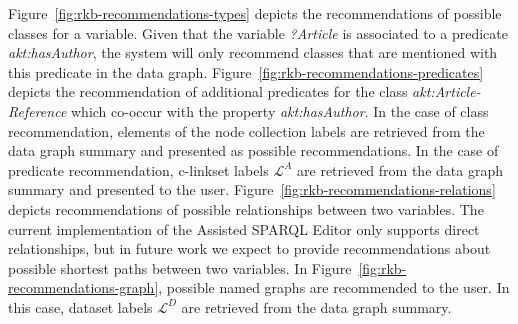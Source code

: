 Figure~\ref{fig:rkb-recommendations-types} depicts the recommendations of possible classes for a variable. Given that the variable \emph{?Article} is associated to a predicate \emph{akt:hasAuthor}, the system will only recommend classes that are mentioned with this predicate in the data graph. Figure~\ref{fig:rkb-recommendations-predicates} depicts the recommendation of additional predicates for the class \emph{akt:Article-Reference} which co-occur with the property \emph{akt:hasAuthor}. In the case of class recommendation, elements of the node collection labels are retrieved from the data graph summary and presented as possible recommendations.
In the case of predicate recommendation, c-linkset labels $\mathcal{L}^A$ are retrieved from the data graph summary and presented to the user.
Figure~\ref{fig:rkb-recommendations-relations} depicts recommendations of possible relationships between two variables. The current implementation of the Assisted SPARQL Editor only supports direct relationships, but in future work we expect to provide recommendations about possible shortest paths between two variables. In Figure~\ref{fig:rkb-recommendations-graph}, possible named graphs are recommended to the user. In this case, dataset labels $\mathcal{L}^D$ are retrieved from the data graph summary.


